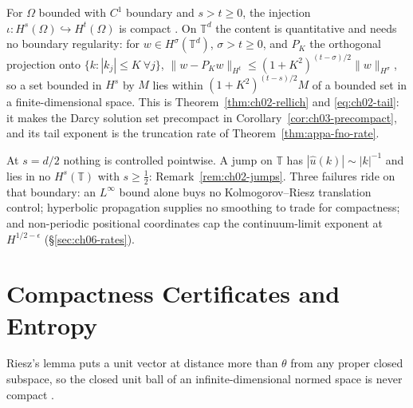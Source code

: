 \begin{theorem}\label{thm:appa-rellich}
For $\Omega$ bounded with $C^1$ boundary and $s > t \ge 0$, the injection
$\iota : H^s(\Omega) \hookrightarrow H^t(\Omega)$ is compact \cite{brezis2011functional}. On
$\mathbb{T}^d$ the content
is quantitative and needs no boundary regularity: for $w \in H^\sigma(\mathbb{T}^d)$,
$\sigma > t \ge 0$, and $P_K$ the orthogonal projection onto $\{k : |k_j| \le K\ \forall j\}$,
$\|w - P_K w\|_{H^t} \le (1+K^2)^{(t-\sigma)/2}\|w\|_{H^\sigma}$, so a set bounded in $H^s$
by $M$ lies within $(1+K^2)^{(t-s)/2}M$ of a bounded set in a finite-dimensional space. This
is Theorem~\ref{thm:ch02-rellich} and \eqref{eq:ch02-tail}: it makes the Darcy solution set
precompact in Corollary~\ref{cor:ch03-precompact}, and its tail exponent is the truncation
rate of Theorem~\ref{thm:appa-fno-rate}.
\end{theorem}

\begin{remark}\label{rem:appa-sharp}
At $s = d/2$ nothing is controlled pointwise. A jump on $\mathbb{T}$ has
$|\hat{u}(k)| \sim |k|^{-1}$ and lies in no $H^s(\mathbb{T})$ with $s \ge \tfrac{1}{2}$:
Remark~\ref{rem:ch02-jumps}. Three failures ride on that boundary: an $L^\infty$ bound alone
buys no Kolmogorov--Riesz translation control; hyperbolic propagation supplies no smoothing to
trade for compactness; and non-periodic positional coordinates cap the continuum-limit
exponent at $H^{1/2-\epsilon}$ (\S\ref{sec:ch06-rates}).
\end{remark}

\section{Compactness Certificates and Entropy}

Riesz's lemma puts a unit vector at distance more than $\theta$ from any proper closed
subspace, so the closed unit ball of an infinite-dimensional normed space is never compact
\cite{brezis2011functional}.

